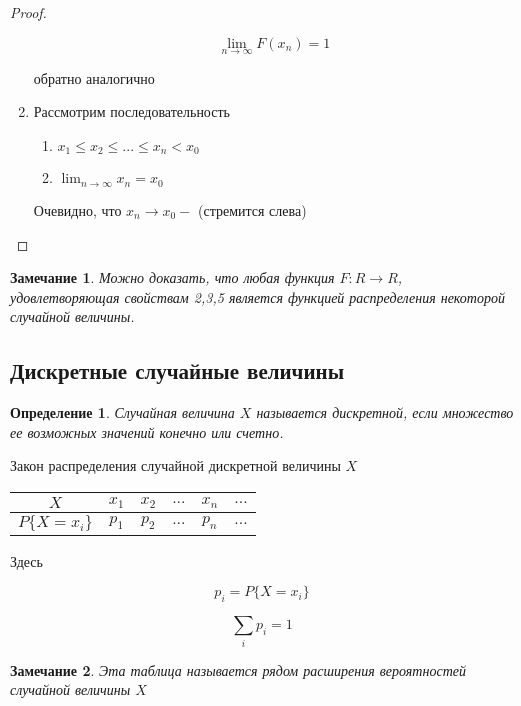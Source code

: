 \documentclass[a4paper, 14pt]{report}
\newtheorem{defenition}{Определение}[section]
\newtheorem{note}{Замечание}[section]
\begin{document}
\begin{proof}
\begin{enumerate}
            $$
            \lim_{n \to \infty} F(x_n) = 1
            $$

            обратно аналогично

        \item Рассмотрим последовательность

            \begin{enumerate}
                \item $x_1 \le x_2 \le ... \le x_n < x_0$
                \item $\lim_{n \to \infty} x_n = x_0$
            \end{enumerate}

            Очевидно, что $x_n \to x_0 -$ (стремится слева)

    \end{enumerate}
\end{proof}

\begin{note}
    Можно доказать, что любая функция $F : R \to R$, удовлетворяющая свойствам 2,3,5 является функцией распределения некоторой случайной величины. 
\end{note}

\subsection{Дискретные случайные величины}

\begin{defenition}
    Случайная величина $X$ называется дискретной, если множество ее возможных значений конечно или счетно.
\end{defenition}

Закон распределения случайной дискретной величины $X$

\begin{tabular}{c|c|c|c|c|c}
    \hline
    $X$ & $x_1$ & $x_2$ & $...$ & $x_n$ & $...$ \\
    \hline
    $P\{X = x_i\}$ & $p_1$ & $p_2$ & $...$ & $p_n$ & $...$ \\
    \hline
\end{tabular}

Здесь

$$
p_i = P\{X = x_i\}
$$


$$
\sum_i p_i = 1
$$

\begin{note}
    Эта таблица называется рядом расширения вероятностей случайной величины $X$ 
\end{note}
\end{document}
